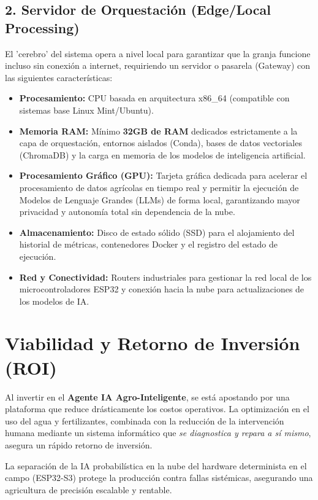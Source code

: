 \documentclass[12pt,a4paper]{article}
\begin{document}
\subsection{2. Servidor de Orquestación (Edge/Local Processing)}
El 'cerebro' del sistema opera a nivel local para garantizar que la granja funcione incluso sin conexión a internet, requiriendo un servidor o pasarela (Gateway) con las siguientes características:
\begin{itemize}
    \item \textbf{Procesamiento:} CPU basada en arquitectura x86\_64 (compatible con sistemas base Linux Mint/Ubuntu).
    \item \textbf{Memoria RAM:} Mínimo \textbf{32GB de RAM} dedicados estrictamente a la capa de orquestación, entornos aislados (Conda), bases de datos vectoriales (ChromaDB) y la carga en memoria de los modelos de inteligencia artificial.
    \item \textbf{Procesamiento Gráfico (GPU):} Tarjeta gráfica dedicada para acelerar el procesamiento de datos agrícolas en tiempo real y permitir la ejecución de Modelos de Lenguaje Grandes (LLMs) de forma local, garantizando mayor privacidad y autonomía total sin dependencia de la nube.
    \item \textbf{Almacenamiento:} Disco de estado sólido (SSD) para el alojamiento del historial de métricas, contenedores Docker y el registro del estado de ejecución.
    \item \textbf{Red y Conectividad:} Routers industriales para gestionar la red local de los microcontroladores ESP32 y conexión hacia la nube para actualizaciones de los modelos de IA.
\end{itemize}

\section{Viabilidad y Retorno de Inversión (ROI)}
Al invertir en el \textbf{Agente IA Agro-Inteligente}, se está apostando por una plataforma que reduce drásticamente los costos operativos. La optimización en el uso del agua y fertilizantes, combinada con la reducción de la intervención humana mediante un sistema informático que \textit{se diagnostica y repara a sí mismo}, asegura un rápido retorno de inversión. 

La separación de la IA probabilística en la nube del hardware determinista en el campo (ESP32-S3) protege la producción contra fallas sistémicas, asegurando una agricultura de precisión escalable y rentable.
\end{document}
